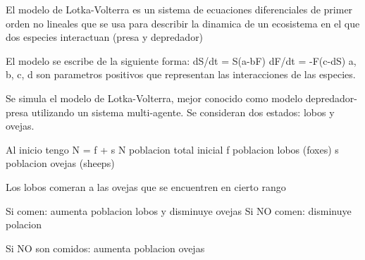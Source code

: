 El modelo de Lotka-Volterra es un sistema de ecuaciones diferenciales de primer orden no lineales que se usa para describir la dinamica de un ecosistema en el que dos especies interactuan (presa y depredador)

El modelo se escribe de la siguiente forma:
dS/dt = S(a-bF)
dF/dt = -F(c-dS) 
a, b, c, d son parametros positivos que representan las interacciones de las especies.



Se simula el modelo de Lotka-Volterra, mejor conocido como modelo depredador-presa utilizando un sistema multi-agente.
Se consideran dos estados: lobos y ovejas.

Al inicio tengo N = f + s
N poblacion total inicial
f poblacion lobos (foxes)
s poblacion ovejas (sheeps)

Los lobos comeran a las ovejas que se encuentren en cierto rango

Si comen: aumenta poblacion lobos y disminuye ovejas
Si NO comen: disminuye polacion

Si NO son comidos: aumenta poblacion ovejas



